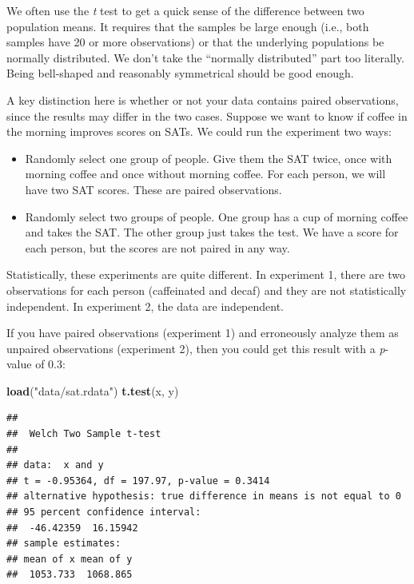 \documentclass[
]{book}
\newenvironment{Shaded}{\begin{snugshade}}{\end{snugshade}}
\newcommand{\KeywordTok}[1]{\textcolor[rgb]{0.13,0.29,0.53}{\textbf{#1}}}
\newcommand{\NormalTok}[1]{#1}
\newcommand{\StringTok}[1]{\textcolor[rgb]{0.31,0.60,0.02}{#1}}
\begin{document}
We often use the \emph{t} test to get a quick sense of the difference between
two population means. It requires that the samples be large enough (i.e., both
samples have 20 or more observations) or that the underlying populations
be normally distributed. We don't take the ``normally distributed'' part
too literally. Being bell-shaped and reasonably symmetrical should be good enough.

A key distinction here is whether or not your data contains paired
observations, since the results may differ in the two cases. Suppose we
want to know if coffee in the morning improves scores on SATs. We
could run the experiment two ways:

\begin{itemize}
\item
  Randomly select one group of people. Give them the SAT twice,
  once with morning coffee and once without morning coffee. For each
  person, we will have two SAT scores. These are paired observations.
\item
  Randomly select two groups of people. One group has a cup of morning
  coffee and takes the SAT. The other group just takes the test.
  We have a score for each person, but the scores are not paired in
  any way.
\end{itemize}

Statistically, these experiments are quite different. In experiment 1,
there are two observations for each person (caffeinated and decaf) and
they are not statistically independent. In experiment 2, the data are
independent.

If you have paired observations (experiment 1) and erroneously analyze
them as unpaired observations (experiment 2), then you could get this
result with a \emph{p}-value of 0.3:

\begin{Shaded}
\begin{Highlighting}[]
\KeywordTok{load}\NormalTok{(}\StringTok{"data/sat.rdata"}\NormalTok{)}
\KeywordTok{t.test}\NormalTok{(x, y)}
\end{Highlighting}
\end{Shaded}

\begin{verbatim}
## 
## 	Welch Two Sample t-test
## 
## data:  x and y
## t = -0.95364, df = 197.97, p-value = 0.3414
## alternative hypothesis: true difference in means is not equal to 0
## 95 percent confidence interval:
##  -46.42359  16.15942
## sample estimates:
## mean of x mean of y 
##  1053.733  1068.865
\end{verbatim}
\end{document}
